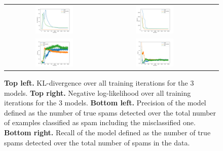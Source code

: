 \documentclass[10pt]{article}
\begin{document}
\begin{figure}[h]
	\centering
	\begin{tabular}{cccc}
		\includegraphics[width=0.4\textwidth]{../figures/kldiv_03.png}
		& 
		\includegraphics[width=0.4\textwidth]{../figures/logp_03.png}\\
		\includegraphics[width=0.4\textwidth]{../figures/precisions_03.png}
		& 
		\includegraphics[width=0.4\textwidth]{../figures/recall_03.png}\\
	\end{tabular}
	\caption{\textbf{Top left.} KL-divergence over all training iterations for the 3 models. \textbf{Top right.} Negative log-likelihood over all training iterations for the 3 models. \textbf{Bottom left.} Precision of the model defined as the number of true spams detected over the total number of examples classified as spam including the misclassified one. \textbf{Bottom right.} Recall of the model defined as the number of true spams detected over the total number of spams in the data.}
	\label{fig:result}
\end{figure}
\end{document}
